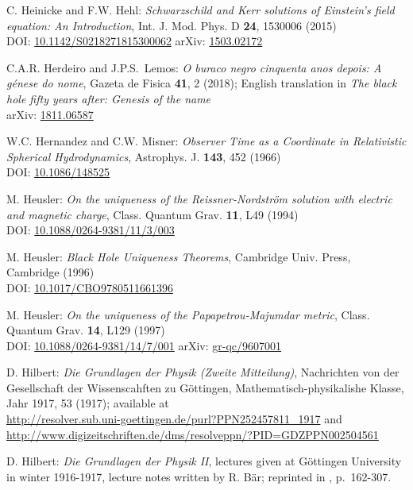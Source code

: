 \begin{thebibliography}{123}
C. Heinicke and F.W. Hehl:
{\em Schwarzschild and Kerr solutions of Einstein's field equation: An Introduction},
Int. J. Mod. Phys. D {\bf 24}, 1530006 (2015)\\
DOI: \href{https://doi.org/10.1142/S0218271815300062}{10.1142/S0218271815300062}\hfill
arXiv: \href{https://arxiv.org/abs/1503.02172}{1503.02172}

C.A.R. Herdeiro and J.P.S.~Lemos:
\emph{O buraco negro cinquenta anos depois:
A génese do nome},
Gazeta de Fisica {\bf 41}, 2 (2018); English translation in
\emph{The black hole fifty years after: Genesis of the name}\\
arXiv: \href{https://arxiv.org/abs/1811.06587}{1811.06587}

W.C. Hernandez and C.W. Misner:
{\em Observer Time as a Coordinate in Relativistic Spherical Hydrodynamics},
Astrophys. J. {\bf 143}, 452 (1966) \\
DOI: \href{https://doi.org/10.1086/148525}{10.1086/148525}

M. Heusler:
{\em On the uniqueness of the Reissner-Nordström solution with electric and magnetic charge},
Class. Quantum Grav. {\bf 11}, L49 (1994)\\
DOI: \href{https://doi.org/10.1088/0264-9381/11/3/003}{10.1088/0264-9381/11/3/003}

M. Heusler:
{\em Black Hole Uniqueness Theorems},
Cambridge Univ. Press, Cambridge (1996) \\
DOI: \href{https://doi.org/10.1017/CBO9780511661396}{10.1017/CBO9780511661396}

M. Heusler:
{\em On the uniqueness of the Papapetrou-Majumdar metric},
Class. Quantum Grav. {\bf 14}, L129 (1997)\\
DOI: \href{https://doi.org/10.1088/0264-9381/14/7/001}{10.1088/0264-9381/14/7/001}\hfill
arXiv: \href{https://arxiv.org/abs/gr-qc/9607001}{gr-qc/9607001}

D. Hilbert:
{\em Die Grundlagen der Physik (Zweite Mitteilung)},
Nachrichten von der Gesellschaft der Wissenscahften zu Göttingen,
Mathematisch-physikalishe Klasse, Jahr 1917, 53 (1917);
available at\\
\url{http://resolver.sub.uni-goettingen.de/purl?PPN252457811_1917} and\\
\url{http://www.digizeitschriften.de/dms/resolveppn/?PID=GDZPPN002504561}

D. Hilbert:
{\em Die Grundlagen der Physik II},
lectures given at Göttingen University in winter 1916-1917,
lecture notes written by R. Bär; reprinted
in \cite{SauerM09}, p.~162-307.


\end{thebibliography}
